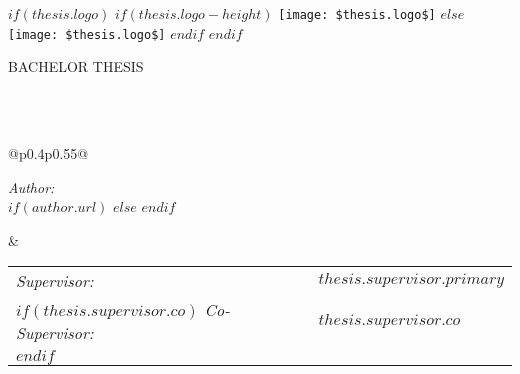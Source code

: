 \frontmatter %

\pagestyle{plain} %


\begin{titlepage}
\begin{center}

$if(thesis.logo)$
$if(thesis.logo-height)$
\texttt{[image: \$thesis.logo\$]} %
$else$
\texttt{[image: \$thesis.logo\$]} %
$endif$
$endif$

\vspace*{.06\textheight}
{\scshape\LARGE \univname\par}\vspace{1.5cm} %
\textsc{\Large BACHELOR THESIS}\\[0.5cm] %

\HRule \\[0.4cm] %
{\LARGE \bfseries \ttitle\par}\vspace{0.4cm} %
\HRule \\[1.5cm] %

\begin{tabular}{@{}p{}p{}@{}}
\begin{flushleft} \large
\emph{Author:}\\
$if(author.url)$
\href{$author.url$}{\textbf{\authorname}} %
$else$
\textbf{\authorname}
$endif$
\end{flushleft}
&
\begin{flushright} \large
\begin{tabular}{@{}ll@{}}
\emph{Supervisor:} & \textbf{$thesis.supervisor.primary$} \\
$if(thesis.supervisor.co)$
\emph{Co-Supervisor:} & \textbf{$thesis.supervisor.co$} \\
$endif$
\end{tabular}
\end{flushright}
\end{tabular}\\[3cm]  


\end{center}
\end{titlepage}
